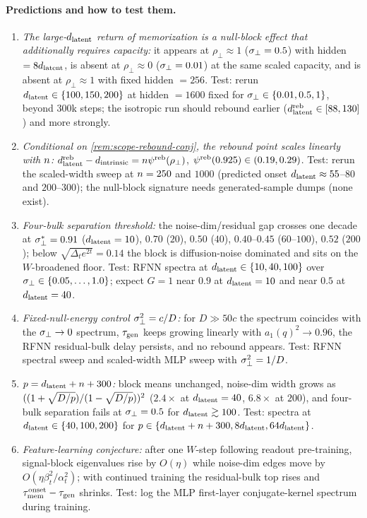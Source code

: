 \paragraph{Predictions and how to test them.}
\begin{enumerate}
\item \emph{The large-$d_{\mathrm{latent}}$ return of memorization is a null-block effect that additionally requires capacity:} it appears at $\rho_\perp\approx1$ ($\sigma_{\perp}=0.5$) with hidden $=8d_{\mathrm{latent}}$, is absent at $\rho_\perp\approx0$ ($\sigma_{\perp}=0.01$) at the same scaled capacity, and is absent at $\rho_\perp\approx1$ with fixed hidden $=256$. Test: rerun $d_{\mathrm{latent}}\in\{100,150,200\}$ at hidden $=1600$ fixed for $\sigma_{\perp}\in\{0.01,0.5,1\}$, beyond $300$k steps; the isotropic run should rebound earlier ($d_{\mathrm{latent}}^{\rm reb}\in[88,130]$) and more strongly.
\item \emph{Conditional on \cref{rem:scope-rebound-conj}, the rebound point scales linearly with $n$:} $d_{\mathrm{latent}}^{\rm reb}-d_{\mathrm{intrinsic}}=n\psi^{\rm reb}(\rho_\perp)$, $\psi^{\rm reb}(0.925)\in(0.19,0.29)$. Test: rerun the scaled-width sweep at $n=250$ and $1000$ (predicted onset $d_{\mathrm{latent}}\approx55$--$80$ and $200$--$300$); the null-block signature needs generated-sample dumps (none exist).
\item \emph{Four-bulk separation threshold:} the noise-dim/residual gap crosses one decade at $\sigma_{\perp}^*=0.91$ ($d_{\mathrm{latent}}=10$), $0.70$ ($20$), $0.50$ ($40$), $0.40$--$0.45$ ($60$--$100$), $0.52$ ($200$); below $\sqrt{\Delta_te^{2t}}=0.14$ the block is diffusion-noise dominated and sits on the $W$-broadened floor. Test: RFNN spectra at $d_{\mathrm{latent}}\in\{10,40,100\}$ over $\sigma_{\perp}\in\{0.05,\dots,1.0\}$; expect $G=1$ near $0.9$ at $d_{\mathrm{latent}}=10$ and near $0.5$ at $d_{\mathrm{latent}}=40$.
\item \emph{Fixed-null-energy control $\sigma_{\perp}^2=c/D$:} for $D\gg50c$ the spectrum coincides with the $\sigma_{\perp}\to0$ spectrum, $\tau_{\mathrm{gen}}$ keeps growing linearly with $a_1(q)^2\to0.96$, the RFNN residual-bulk delay persists, and no rebound appears. Test: RFNN spectral sweep and scaled-width MLP sweep with $\sigma_{\perp}^2=1/D$.
\item \emph{$p=d_{\mathrm{latent}}+n+300$:} block means unchanged, noise-dim width grows as $((1+\sqrt{D/p})/(1-\sqrt{D/p}))^2$ ($2.4\times$ at $d_{\mathrm{latent}}=40$, $6.8\times$ at $200$), and four-bulk separation fails at $\sigma_{\perp}=0.5$ for $d_{\mathrm{latent}}\gtrsim100$. Test: spectra at $d_{\mathrm{latent}}\in\{40,100,200\}$ for $p\in\{d_{\mathrm{latent}}+n+300,8d_{\mathrm{latent}},64d_{\mathrm{latent}}\}$.
\item \emph{Feature-learning conjecture:} after one $W$-step following readout pre-training, signal-block eigenvalues rise by $O(\eta)$ while noise-dim edges move by $O(\eta\beta_t^2/\alpha_t^2)$; with continued training the residual-bulk top rises and $\tau_{\mathrm{mem}}^{\rm onset}-\tau_{\mathrm{gen}}$ shrinks. Test: log the MLP first-layer conjugate-kernel spectrum during training.
\end{enumerate}

